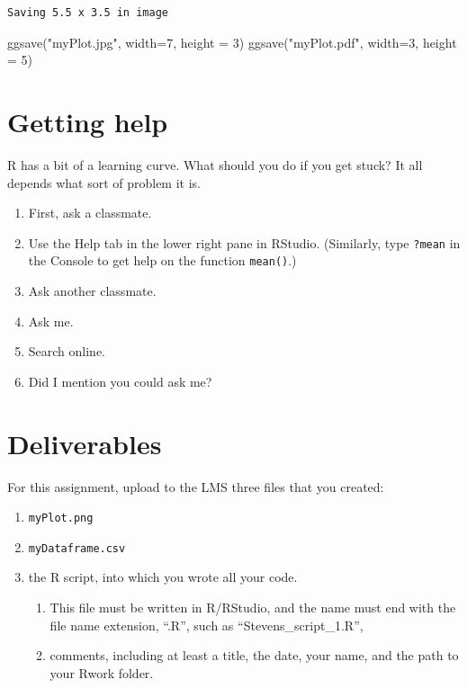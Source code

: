 \documentclass[
  letterpaper,
  DIV=11,
  numbers=noendperiod]{scrreprt}
\newenvironment{Shaded}{\begin{snugshade}}{\end{snugshade}}
\newcommand{\AttributeTok}[1]{\textcolor[rgb]{0.40,0.45,0.13}{#1}}
\newcommand{\DecValTok}[1]{\textcolor[rgb]{0.68,0.00,0.00}{#1}}
\newcommand{\FunctionTok}[1]{\textcolor[rgb]{0.28,0.35,0.67}{#1}}
\newcommand{\NormalTok}[1]{\textcolor[rgb]{0.00,0.23,0.31}{#1}}
\newcommand{\StringTok}[1]{\textcolor[rgb]{0.13,0.47,0.30}{#1}}
\providecommand{\tightlist}{%
  \setlength{\itemsep}{0pt}\setlength{\parskip}{0pt}}
\begin{document}
\begin{verbatim}
Saving 5.5 x 3.5 in image
\end{verbatim}

\begin{Shaded}
\begin{Highlighting}[]
\FunctionTok{ggsave}\NormalTok{(}\StringTok{"myPlot.jpg"}\NormalTok{, }\AttributeTok{width=}\DecValTok{7}\NormalTok{, }\AttributeTok{height =} \DecValTok{3}\NormalTok{)}
\FunctionTok{ggsave}\NormalTok{(}\StringTok{"myPlot.pdf"}\NormalTok{, }\AttributeTok{width=}\DecValTok{3}\NormalTok{, }\AttributeTok{height =} \DecValTok{5}\NormalTok{)}
\end{Highlighting}
\end{Shaded}

\section{Getting help}\label{getting-help}

R has a bit of a learning curve. What should you do if you get stuck? It
all depends what sort of problem it is.

\begin{enumerate}
\def\labelenumi{\arabic{enumi}.}
\tightlist
\item
  First, ask a classmate.
\item
  Use the Help tab in the lower right pane in RStudio. (Similarly, type
  \texttt{?mean} in the Console to get help on the function
  \texttt{mean()}.)
\item
  Ask another classmate.
\item
  Ask me.
\item
  Search online.
\item
  Did I mention you could ask me?
\end{enumerate}

\section{Deliverables}\label{deliverables-1}

For this assignment, upload to the LMS three files that you created:

\begin{enumerate}
\def\labelenumi{\arabic{enumi}.}
\tightlist
\item
  \texttt{myPlot.png}
\item
  \texttt{myDataframe.csv}
\item
  the R script, into which you wrote all your code.

  \begin{enumerate}
  \def\labelenumii{\alph{enumii}.}
  \tightlist
  \item
    This file must be written in R/RStudio, and the name must end with
    the file name extension, ``.R'', such as ``Stevens\_script\_1.R'',
  \item
    comments, including at least a title, the date, your name, and the
    path to your Rwork folder.
  \end{enumerate}
\end{enumerate}
\end{document}
